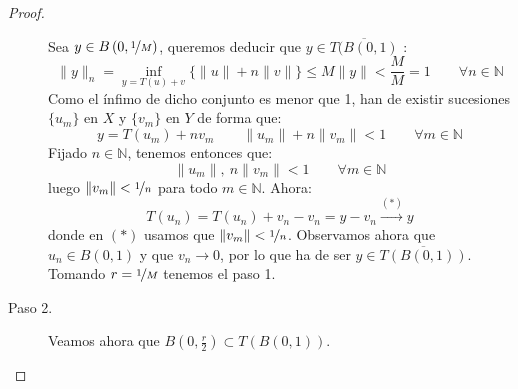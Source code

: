 \begin{teo}
\begin{proof}
\begin{description}
\begin{equation*}
                \end{equation*}
                Sea $y\in B\left(0,\nicefrac{1}{M}\right)$, queremos deducir que $y\in \overline{T(B(0,1)}$ :
                \begin{equation*}
                    \|y\|_n = \inf_{y=T(u)+v}\{\|u\|+n\|v\|\} \leq M \|y\| < \frac{M}{M} = 1 \qquad \forall n\in \mathbb{N}
                \end{equation*}
                Como el ínfimo de dicho conjunto es menor que 1, han de existir sucesiones $\{u_m\}$ en $X$ y $\{v_m\}$ en $Y$ de forma que:
                \begin{equation*}
                    y = T(u_m) + nv_m \qquad  \|u_m\| + n\|v_m\| < 1 \qquad \forall m\in \mathbb{N}
                \end{equation*}
                Fijado $n\in \mathbb{N}$, tenemos entonces que:
                \begin{equation*}
                    \|u_m\|,\ n\|v_m\| < 1 \qquad \forall m\in \mathbb{N}
                \end{equation*}
                luego $\|v_m\| < \nicefrac{1}{n}$ para todo $m\in \mathbb{N}$. Ahora:
                \begin{equation*}
                    T(u_n) = T(u_n) + v_n - v_n = y - v_n \stackrel{(\ast)}{\to} y
                \end{equation*}
                donde en $(\ast)$ usamos que $\|v_m\| < \nicefrac{1}{n}$. Observamos ahora que $u_n\in B(0,1)$ y que $v_n \to 0$, por lo que ha de ser $y\in \overline{T(B(0,1))}$. Tomando $r=\nicefrac{1}{M}$ tenemos el paso 1.
            \item [Paso 2.] Veamos ahora que $B\left(0,\frac{r}{2}\right)\subset T(B(0,1))$.
               

\end{description}
\end{proof}
\end{teo}

